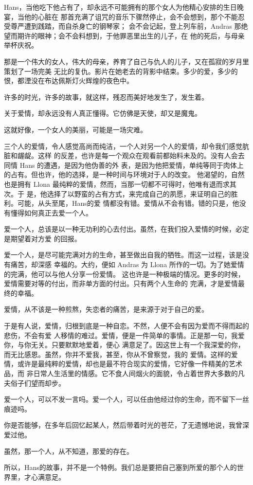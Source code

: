 		Hans，当他吃下他占有了，却永远不可能拥有的那个女人为他精心安排的生日晚宴，当他的心脏在
	那首充满了诅咒的音乐下骤然停止，会不会想到，那个不能忍受尊严遭到践踏，而自杀身亡的钢琴家；
	会不会记起，登上列车前，Andras 那绝望而期许的眼神；会不会料想到，于他罪恶里出生的儿子，在
	他的死后，与母亲举杯庆祝。

		那是一个伟大的女人，伟大的母亲，养育了自己与仇人的儿子，又在孤寂的岁月里策划了一场完美
	无比的复仇。影片在她老去的背影中结束。多少的爱，多少的恨，都湮没在布达佩斯灯火辉煌的夜色中。

		许多的时光，许多的故事，就这样，残忍而美好地发生了，发生着。\par
		关于爱情，却永远没有人真正懂得。它仿佛是天使，却又是魔鬼。\par
		这就好像，一个女人的美丽，可能是一场灾难。

		三个人的爱情，令人感觉高尚而纯洁，一个人对另一个人的爱情，却令我们感觉肮脏和龌龊。这样
	的反差，也许是每一个观众在观看前都始料未及的。没有人会去同情 Hans 的遭遇，是因为他伪善的外
	表，是因为他把爱情，单纯等同于肉体上的占有。但也许，他的选择，是一种时间与环境对于人的改变。
	他渴望的，自然也是拥有 Llona 最纯粹的爱情，然而，当那一切都不可得时，他唯有退而求其次。于
	是，他选择了以野蛮的占有方式，来完成自己的夙愿，来证明自己的胜利。可能，从头至尾，Hans的爱
	情都没有错。爱情从不会有错。错的只是，他没有懂得如何真正去爱一个人。

		爱一个人，总该是以一种无功利的心去付出。虽然，在我们投入爱情的时候，必定是期望着对方爱
	的回报。

		爱一个人，是尽可能完满对方的生命，甚至做出自我的牺牲。而这一过程，该是没有痛苦，却深感
	幸福的。大约，便如 Andras 为 Llona 所作的一切。为了她爱情的完满，他可以与他人分享一份爱情。
	这也许是一种极端的情况。更多的时候，爱情需要对等的付出，而非单方面的付出。只有两个人生命的
	完满，才是爱情最终的幸福。

		爱情，从不该是一种煎熬，失恋者的痛苦，是来源于对于自己的爱。

		于是有人说，爱情，归根到底是一种自恋。不然，人便不会有因为爱而不得而起的悲伤，不会有爱
	人移情的难过。爱情，便是一件简单的事情。正是那一句，我爱你，与你无关。只要默默地爱着，便心
	满意足了。因这世上有一个我深爱的你，而无比感恩。虽然，你并不爱我，甚至，你从不曾察觉，我的
	爱情。这样的爱情，或许是最纯粹的爱情，却也是最不符合现实的爱情，它好像一件精美的艺术品，而
	非日常人生活里的情感。它不食人间烟火的面貌，令占着世界大多数的凡夫俗子们望而却步。

		爱一个人，可以不发一言吗。爱一个人，可以任由他经过你的生命，而不留下一丝痕迹吗。\par
		你是否能够，在多年后回忆起某人，然后带着时光的苍茫，了无遗憾地说，我曾深爱过他。\par
		虽然，那一个人，从不知道，那爱的存在。\par
		所以，Hans的故事，并不是一个特例。我们总是要把自己塞到所爱的那个人的世界里，才心满意足。

